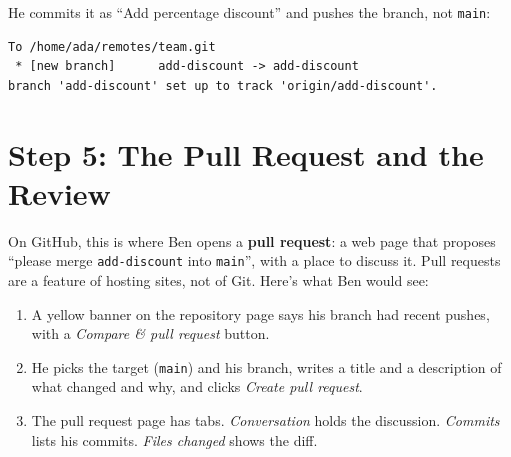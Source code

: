 
He commits it as ``Add percentage discount'' and pushes the branch, not \texttt{main}:

\begin{codeblock}

\begin{Shaded}
\begin{Highlighting}[]
\end{Highlighting}
\end{Shaded}

\end{codeblock}

\begin{codeblock}
\begin{Verbatim}[formatcom=\outputstyle]
To /home/ada/remotes/team.git
 * [new branch]      add-discount -> add-discount
branch 'add-discount' set up to track 'origin/add-discount'.
\end{Verbatim}
\end{codeblock}

\section{Step 5: The Pull Request and the Review}\label{11-lab-work-on-a-project-with-someone-else:step-5-the-pull-request-and-the-review}

On GitHub, this is where Ben opens a \textbf{pull request}: a web page that proposes ``please merge \texttt{add-discount} into \texttt{main}'', with a place to discuss it. Pull requests are a feature of hosting sites, not of Git. Here's what Ben would see:

\begin{enumerate}
\def\labelenumi{\arabic{enumi}.}
\tightlist
\item
  A yellow banner on the repository page says his branch had recent pushes, with a \emph{Compare \& pull request} button.
\item
  He picks the target (\texttt{main}) and his branch, writes a title and a description of what changed and why, and clicks \emph{Create pull request}.
\item
  The pull request page has tabs. \emph{Conversation} holds the discussion. \emph{Commits} lists his commits. \emph{Files changed} shows the diff.
\end{enumerate}

